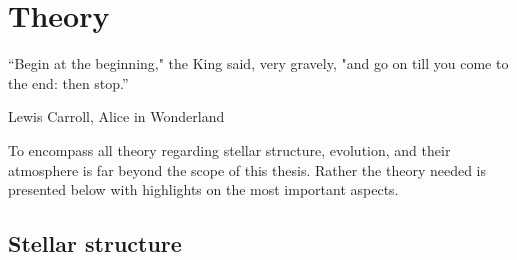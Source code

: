 \chapter{Theory}
\label{cha:theory}

\epigraph{“Begin at the beginning," the King said, very gravely, "and go on till you come to the
          end: then stop.”}{Lewis Carroll, Alice in Wonderland}

To encompass all theory regarding stellar structure, evolution, and their atmosphere is far beyond
the scope of this thesis. Rather the theory needed is presented below with highlights on the most
important aspects.

\section{Stellar structure}

